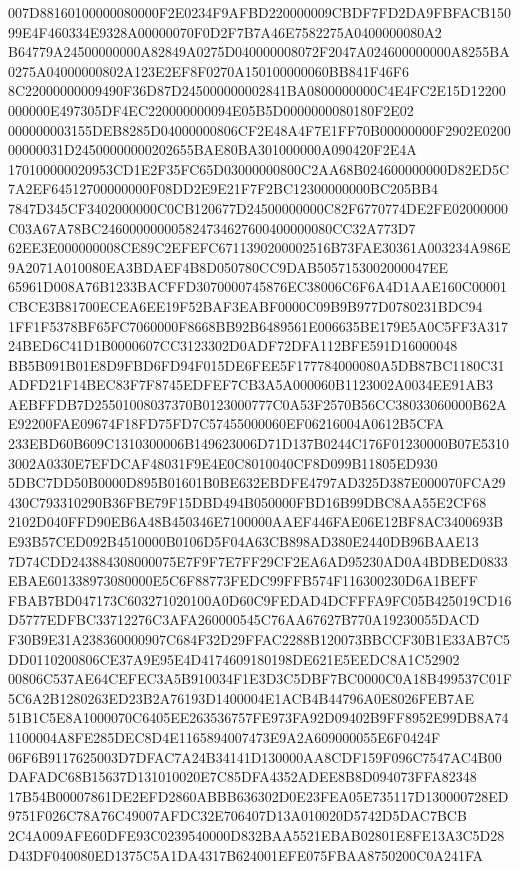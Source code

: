 \documentclass[UTF8,fontset=fandol,zihao=-4,a4paper]{ctexart}
\begin{document}
{{007D88160100000080000F2E0234F9AFBD220000009CBDF7FD2DA9FBFACB15099E4F460334E9328A00000070F0D2F7B7A46E7582275A0400000080A2
B64779A24500000000A82849A0275D040000008072F2047A024600000000A8255BA0275A04000000802A123E2EF8F0270A150100000060BB841F46F6
8C22000000009490F36D87D245000000002841BA0800000000C4E4FC2E15D12200000000E497305DF4EC220000000094E05B5D0000000080180F2E02
000000003155DEB8285D04000000806CF2E48A4F7E1FF70B00000000F2902E020000000031D24500000000202655BAE80BA301000000A090420F2E4A
170100000020953CD1E2F35FC65D03000000800C2AA68B024600000000D82ED5C7A2EF64512700000000F08DD2E9E21F7F2BC12300000000BC205BB4
7847D345CF3402000000C0CB120677D24500000000C82F6770774DE2FE02000000C03A67A78BC246000000005824734627600400000080CC32A773D7
62EE3E000000008CE89C2EFEFC6711390200002516B73FAE30361A003234A986E9A2071A010080EA3BDAEF4B8D050780CC9DAB5057153002000047EE
65961D008A76B1233BACFFD3070000745876EC38006C6F6A4D1AAE160C00001CBCE3B81700ECEA6EE19F52BAF3EABF0000C09B9B977D0780231BDC94
1FF1F5378BF65FC7060000F8668BB92B6489561E006635BE179E5A0C5FF3A31724BED6C41D1B0000607CC3123302D0ADF72DFA112BFE591D16000048
BB5B091B01E8D9FBD6FD94F015DE6FEE5F177784000080A5DB87BC1180C31ADFD21F14BEC83F7F8745EDFEF7CB3A5A000060B1123002A0034EE91AB3
AEBFFDB7D25501008037370B0123000777C0A53F2570B56CC38033060000B62AE92200FAE09674F18FD75FD7C57455000060EF06216004A0612B5CFA
233EBD60B609C1310300006B149623006D71D137B0244C176F01230000B07E53103002A0330E7EFDCAF48031F9E4E0C8010040CF8D099B11805ED930
5DBC7DD50B0000D895B01601B0BE632EBDFE4797AD325D387E000070FCA29430C793310290B36FBE79F15DBD494B050000FBD16B99DBC8AA55E2CF68
2102D040FFD90EB6A48B450346E7100000AAEF446FAE06E12BF8AC3400693BE93B57CED092B4510000B0106D5F04A63CB898AD380E2440DB96BAAE13
7D74CDD243884308000075E7F9F7E7FF29CF2EA6AD95230AD0A4BDBED0833EBAE601338973080000E5C6F88773FEDC99FFB574F116300230D6A1BEFF
FBAB7BD047173C603271020100A0D60C9FEDAD4DCFFFA9FC05B425019CD16D5777EDFBC33712276C3AFA260000545C76AA67627B770A19230055DACD
F30B9E31A238360000907C684F32D29FFAC2288B120073BBCCF30B1E33AB7C5DD0110200806CE37A9E95E4D4174609180198DE621E5EEDC8A1C52902
00806C537AE64CEFEC3A5B910034F1E3D3C5DBF7BC0000C0A18B499537C01F5C6A2B1280263ED23B2A76193D1400004E1ACB4B44796A0E8026FEB7AE
51B1C5E8A1000070C6405EE263536757FE973FA92D09402B9FF8952E99DB8A741100004A8FE285DEC8D4E1165894007473E9A2A609000055E6F0424F
06F6B9117625003D7DFAC7A24B34141D130000AA8CDF159F096C7547AC4B00DAFADC68B15637D131010020E7C85DFA4352ADEE8B8D094073FFA82348
17B54B00007861DE2EFD2860ABBB636302D0E23FEA05E735117D130000728ED9751F026C78A76C49007AFDC32E706407D13A010020D5742D5DAC7BCB
2C4A009AFE60DFE93C0239540000D832BAA5521EBAB02801E8FE13A3C5D28D43DF040080ED1375C5A1DA4317B624001EFE075FBAA8750200C0A241FA
}}
\end{document}
